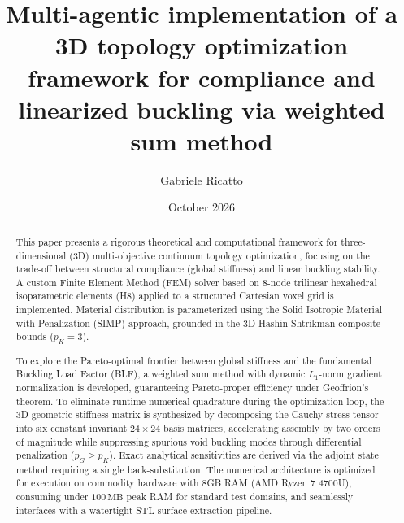 \documentclass[11pt, a4paper]{article}
\title{\textbf{Multi-agentic implementation of a 3D topology optimization framework for compliance and linearized buckling via weighted sum method}}
\author{Gabriele Ricatto}
\date{October 2026}
\begin{document}
\maketitle

\begin{abstract}
This paper presents a rigorous theoretical and computational framework for three-dimensional (3D) multi-objective continuum topology optimization, focusing on the trade-off between structural compliance (global stiffness) and linear buckling stability. A custom Finite Element Method (FEM) solver based on 8-node trilinear hexahedral isoparametric elements (H8) applied to a structured Cartesian voxel grid is implemented. Material distribution is parameterized using the Solid Isotropic Material with Penalization (SIMP) approach, grounded in the 3D Hashin-Shtrikman composite bounds ($p_K = 3$).

To explore the Pareto-optimal frontier between global stiffness and the fundamental Buckling Load Factor (BLF), a weighted sum method with dynamic $L_1$-norm gradient normalization is developed, guaranteeing Pareto-proper efficiency under Geoffrion's theorem. To eliminate runtime numerical quadrature during the optimization loop, the 3D geometric stiffness matrix is synthesized by decomposing the Cauchy stress tensor into six constant invariant $24 \times 24$ basis matrices, accelerating assembly by two orders of magnitude while suppressing spurious void buckling modes through differential penalization ($p_G \ge p_K$). Exact analytical sensitivities are derived via the adjoint state method requiring a single back-substitution. The numerical architecture is optimized for execution on commodity hardware with 8GB RAM (AMD Ryzen 7 4700U), consuming under $100\,\text{MB}$ peak RAM for standard test domains, and seamlessly interfaces with a watertight STL surface extraction pipeline.
\end{abstract}
\end{document}
